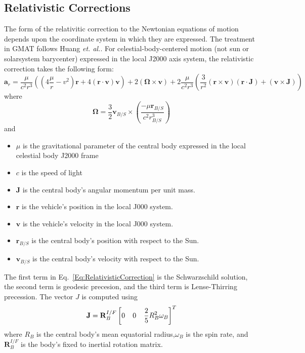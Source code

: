 \subsection{Relativistic Corrections}

The form of the relativitic correction to the Newtonian equations of motion depends upon the coordinate system in which they are expressed.  The treatment in GMAT follows Huang\cite{Huang:90} \emph{et. al.}. For celestial-body-centered motion (not sun or solarsystem barycenter) expressed in the local J2000 axis system, the relativistic correction takes the following form:
%
\begin{equation}
    \mathbf{a}_r = \frac{\mu}{c^2 r^3}\left(  \left( 4\frac{\mu}{r} - v^2\right)\mathbf{r} +   4(\mathbf{r}\cdot\mathbf{v})\mathbf{v}\right) + 2 (\boldsymbol{\Omega} \times \mathbf{v}) + 2 \frac{\mu}{c^2 r^3}
    \left( \frac{3}{r^2}(\mathbf{r} \times \mathbf{v})(\mathbf{r} \cdot \mathbf{J}) +(\mathbf{v}\times\mathbf{J}) \right)
    \label{Eq:RelativisticCorrection}
\end{equation}
%
where
%
\begin{equation}
   \boldsymbol{\Omega} = \frac{3}{2} \mathbf{v}_{B/S} \times \left( \frac{-\mu \mathbf{r}_{B/S}}{c^2r_{B/S}^3} \right)
\end{equation}
%
and
%
\begin{itemize}
   \item  $\mu$ is the gravitational parameter of the central body expressed in the local celestial body J2000 frame
   \item  $c$ is the speed of light
   \item  $\mathbf{J}$ is the central body's angular momentum per unit mass.
   \item  $\mathbf{r}$ is the vehicle's position in the local J000 system.
   \item  $\mathbf{v}$ is the vehicle's velocity in the local J000 system.
   \item  $\mathbf{r}_{B/S}$ is the central body's position with respect to the Sun.
   \item  $\mathbf{v}_{B/S}$ is the central body's velocity with respect to the Sun.
\end{itemize}
%
The first term in Eq.~\ref{Eq:RelativisticCorrection} is the Schwarzschild solution, the second term is geodesic precesion, and the third term is Lense-Thirring precession.  The vector $J$ is computed using
%
\begin{equation}
    \mathbf{J} = \mathbf{R}_B^{I/F}\left[ 0   \hspace{0.15 in} 0  \hspace{0.15 in}   \frac{2}{5}R_B^2 \omega_B \right]^T
\end{equation}
%
where $R_B$ is the central body's mean equatorial radius,$\omega_B$ is the spin rate, and $\mathbf{R}_B^{I/F}$ is the
body's fixed to inertial rotation matrix.

